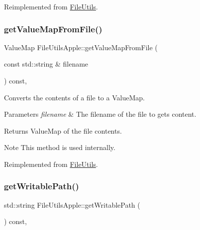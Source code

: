 Reimplemented from \hyperlink{classFileUtils_a67aa84a7b5bcfb46a646260c084ad829}{File\+Utils}.

\mbox{\label{classFileUtilsApple_a400898c9e5777199a45372e98f1c6e0c}} 
\subsubsection{\texorpdfstring{get\+Value\+Map\+From\+File()}{getValueMapFromFile()}\hspace{0.1cm}{\footnotesize\ttfamily [2/2]}}
{\footnotesize\ttfamily Value\+Map File\+Utils\+Apple\+::get\+Value\+Map\+From\+File (\begin{DoxyParamCaption}\item[{const std\+::string \&}]{filename }\end{DoxyParamCaption}) const\hspace{0.3cm}{\ttfamily [override]}, {\ttfamily [virtual]}}

Converts the contents of a file to a Value\+Map. 
\begin{DoxyParams}{Parameters}
{\em filename} & The filename of the file to gets content. \\
\hline
\end{DoxyParams}
\begin{DoxyReturn}{Returns}
Value\+Map of the file contents. 
\end{DoxyReturn}
\begin{DoxyNote}{Note}
This method is used internally. 
\end{DoxyNote}


Reimplemented from \hyperlink{classFileUtils_a7a5c18baa7c28962d642c101513c7c1b}{File\+Utils}.

\mbox{\label{classFileUtilsApple_ab88aca64f02b23087542ed28f1ad43d8}} 
\subsubsection{\texorpdfstring{get\+Writable\+Path()}{getWritablePath()}\hspace{0.1cm}{\footnotesize\ttfamily [1/2]}}
{\footnotesize\ttfamily std\+::string File\+Utils\+Apple\+::get\+Writable\+Path (\begin{DoxyParamCaption}{ }\end{DoxyParamCaption}) const\hspace{0.3cm}{\ttfamily [override]}, {\ttfamily [virtual]}}

